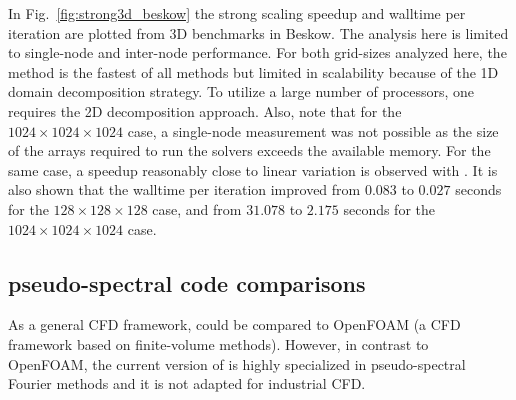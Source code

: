 In Fig.~\ref{fig:strong3d_beskow} the strong scaling speedup and walltime per
iteration are plotted from 3D benchmarks in Beskow.
%
The analysis here is limited to single-node and inter-node performance.
%
For both grid-sizes analyzed here, the 
method is the fastest of all methods but limited in scalability because of the
1D domain decomposition strategy.  To utilize a large number of processors, one
requires the 2D decomposition approach. Also, note that for the
$1024\times1024\times1024$ case, a single-node measurement was not possible as
the size of the arrays required to run the solvers exceeds the available
memory. For the same case, a speedup reasonably close to linear variation is
observed with .
%
It is also shown that the walltime per iteration improved from
%
$0.083$ to $0.027$ seconds for the $128\times128\times128$ case, and from
$31.078$ to $2.175$ seconds for the $1024\times1024\times1024$ case.



\subsection{pseudo-spectral code comparisons}



As a general CFD framework,  could be compared to OpenFOAM (a CFD
framework based on finite-volume methods).
%
However, in contrast to OpenFOAM, the current version of  is highly
specialized in pseudo-spectral Fourier methods and it is not adapted for
industrial CFD.

